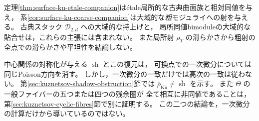\begin{remark}[局所幾何化の範囲とshadowとの比較]
\label{rem:surface-ku-shadow-unresolved}
定理\ref{thm:surface-ku-etale-companion}は\'{e}tale局所的な古典曲面族と相対同値を与え，
系\ref{cor:surface-ku-coarse-companion}は大域的な\emph{粗}モジュライへの射を与える。
古典スタック $\mathcal D_{2,d}$ への大域的な持上げと，
局所同値bimoduleの大域的な貼合せは，これらの主張には含まれない。
また局所射 $\rho_T$ の滑らかさから粗射の全点での滑らかさや平坦性を結論しない。

中心関係の対称化が与える $\operatorname{sh}$ とこの復元は，
可換点での一次微分については同じPoisson方向を消す。
しかし，一次微分の一致だけでは高次の一致は従わない。
第\ref{sec:kuznetsov-shadow-obstruction}節では
$\overline\rho_{\mathrm{Ku}}\ne\overline{\operatorname{sh}}$ を示す。
また $\Theta$ の一般ファイバーの五つまたは四つの残余圏が
全て相互に非同値であることは，第\ref{sec:kuznetsov-cyclic-fibres}節で別に証明する。
この二つの結論を，一次微分の計算だけから導いているのではない。
\end{remark}
